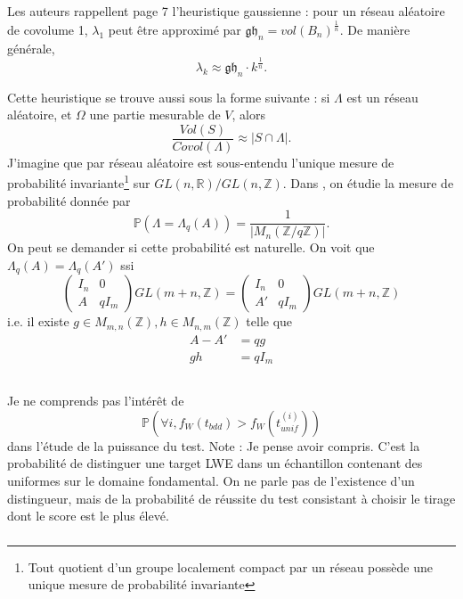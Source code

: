 \documentclass{article}
\begin{document}
Les auteurs rappellent page 7 l'heuristique gaussienne : pour un réseau aléatoire de covolume 1, $\lambda_1$ peut être approximé par $\mathfrak{gh}_n = vol(B_n)^{\frac{1}{n}}$. De manière générale,
$$\lambda_k \approx \mathfrak{gh}_n \cdot k^{\frac{1}{n}}.$$ %

Cette heuristique se trouve aussi sous la forme suivante : si $\Lambda$ est un réseau aléatoire, et $\Omega$ une partie mesurable de $V$, alors 
\[\frac{Vol(S)}{Covol(\Lambda)} \approx |S\cap \Lambda|.\]
J'imagine que par réseau aléatoire est sous-entendu l'unique mesure de probabilité invariante\footnote{Tout quotient d'un groupe localement compact par un réseau possède une unique mesure de probabilité invariante} sur $GL(n,\mathbb R) / GL(n,\mathbb Z)$. Dans \cite{Shen}, on étudie la mesure de probabilité donnée par 
\[\mathbb P(\Lambda = \Lambda_q (A) ) = \frac{1}{|M_n(\mathbb Z / q\mathbb Z)|}.\]
On peut se demander si cette probabilité est naturelle. On voit que $\Lambda_q(A) = \Lambda_q(A')$ ssi 
\[\begin{pmatrix} I_n & 0 \\ A & qI_m \end{pmatrix} GL(m+n,\mathbb Z) = \begin{pmatrix} I_n & 0 \\ A' & qI_m \end{pmatrix}GL(m+n,\mathbb Z)\]
i.e. il existe $g\in M_{m,n}(\mathbb Z), h \in M_{n,m}(\mathbb Z)$ telle que 
\[\begin{split} 
A-A' & = qg \\
gh   & = qI_m \\
\end{split}\]	 

 
\subsubsection{}

Je ne comprends pas l'intérêt de
$$\mathbb P( \forall i , f_W(t_{bdd}) > f_W(t^{(i)}_{unif}) )   $$
dans l'étude de la puissance du test. Note : Je pense avoir compris. C'est la probabilité de distinguer une target LWE dans un échantillon contenant des uniformes sur le domaine fondamental. On ne parle pas de l'existence d'un distingueur, mais de la probabilité de réussite du test consistant à choisir le tirage dont le score est le plus élevé.

\subsubsection{}
\end{document}
